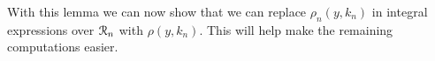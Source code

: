 With this lemma we can now show that we can replace $\rho_n(y,k_n)$ in integral expressions over ${\mathcal R}_n$ with $\rho(y,k_n)$. This will help make the remaining computations easier.

%
%
%

